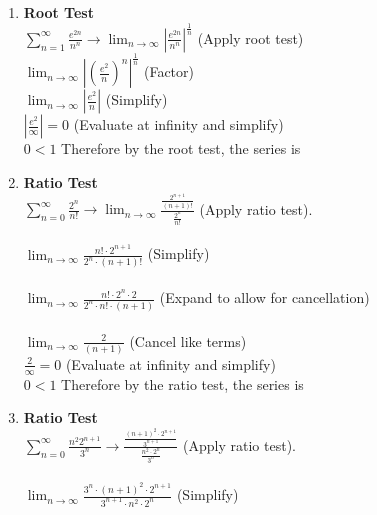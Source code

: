 \documentclass[9pt]{article}
\begin{document}
\begin {enumerate} 
	\item \textbf{Root Test} \\
		$ \displaystyle \sum_{n=1}^{\infty} \frac{e^{2n}}{n^n} \rightarrow  \lim_{n \to  \infty} \left|\frac{e^{2n}}{n^n}\right|^{\frac{1}{n}}$ \hfill (Apply root test) \\
		$ \displaystyle \lim_{n \to  \infty} \left|\left(\frac{e^{2}}{n}\right)^n\right|^{\frac{1}{n}}$ \hfill (Factor) \\
		$ \displaystyle \lim_{n \to  \infty} \left|\frac{e^{2}}{n}\right|$ \hfill (Simplify) \\
		$ \displaystyle \left|\frac{e^{2}}{\infty}\right| = 0 $ \hfill (Evaluate at infinity and simplify)\\
		$ 0 < 1 $ Therefore by the root test, the series is \\
	\item \textbf{Ratio Test} \\
		$ \displaystyle \sum_{n=0}^{\infty} \frac{2^n}{n!} \rightarrow \lim_{n \to  \infty} \frac{\frac{2^{n+1}}{(n+1)!}}{\frac{2^n}{n!}}$ \hfill (Apply ratio test). \\
		\\$\displaystyle \lim_{n \to  \infty} \frac{n! \cdot 2^{n+1}}{2^n \cdot (n+1)!}$ \hfill (Simplify) \\
		\\$\displaystyle \lim_{n \to  \infty} \frac{n! \cdot 2^n \cdot 2}{2^n \cdot n! \cdot (n+1)}$ (Expand to allow for cancellation) \\
		\\$\displaystyle \lim_{n \to  \infty} \frac{2}{(n+1)}$ \hfill (Cancel like terms) \\
		$ \displaystyle \frac{2}{\infty} = 0 $ \hfill (Evaluate at infinity and simplify)\\
		$ 0 < 1 $ Therefore by the ratio test, the series is \\
	\newpage
	\item \textbf{Ratio Test} \\
		$ \displaystyle \sum_{n=0}^{\infty} \frac{n^2  2^{n+1}}{3^n} \rightarrow \frac{\frac{(n+1)^2\cdot 2^{n+1}}{3^{n+1}}}{\frac{n^2 \cdot 2^n}{3^n}}$ \hfill (Apply ratio test). \\
		\\$\displaystyle \lim_{n \to  \infty} \frac{3^n \cdot (n+1)^2 \cdot 2^ {n+1}}{3^{n+1} \cdot n^2 \cdot 2^n}$ \hfill (Simplify) \\

\end{enumerate}
\end{document}
